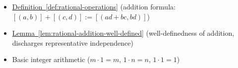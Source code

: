 \begin{dependencies}
\begin{itemize}
  \item \hyperref[def:rational-operations]{Definition~\ref*{def:rational-operations}}
        \textnormal{(addition formula: $[(a,b)]+[(c,d)]:=[(ad+bc,bd)]$)}
  \item \hyperref[lem:rational-addition-well-defined]{Lemma~\ref*{lem:rational-addition-well-defined}}
        \textnormal{(well-definedness of addition, discharges representative independence)}
  \item Basic integer arithmetic ($m\cdot 1 = m$, $1\cdot n = n$, $1\cdot 1 = 1$)
\end{itemize}
\end{dependencies}

\clearpage
